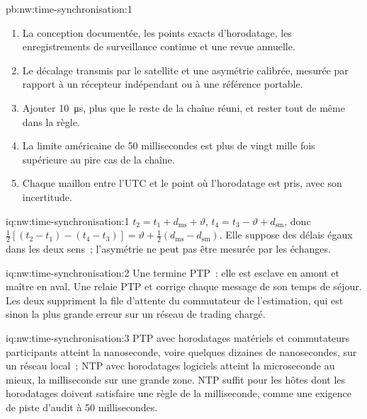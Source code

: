 \begin{solution}{pb:nw:time-synchronisation:1}
\begin{enumerate}
\item La conception documentée, les points exacts d'horodatage, les enregistrements de surveillance continue et une revue annuelle.
\item Le décalage transmis par le satellite et une asymétrie calibrée, mesurée par rapport à un récepteur indépendant ou à une référence portable.
\item Ajouter \qty{10}{\micro\second}, plus que le reste de la chaîne réuni, et rester tout de même dans la règle.
\item La limite américaine de 50 millisecondes est plus de vingt mille fois supérieure au pire cas de la chaîne.
\item Chaque maillon entre l'UTC et le point où l'horodatage est pris, avec son incertitude.
\end{enumerate}
\end{solution}

\begin{solution}{iq:nw:time-synchronisation:1}
$t_2 = t_1 + d_{\mathrm{ms}} + \vartheta$, $t_4 = t_3 - \vartheta + d_{\mathrm{sm}}$, donc
$\tfrac12[(t_2 - t_1) - (t_4 - t_3)] = \vartheta + \tfrac12(d_{\mathrm{ms}} - d_{\mathrm{sm}})$. Elle suppose des délais égaux dans les deux sens~;
l'asymétrie ne peut pas être mesurée par les échanges.
\end{solution}

\begin{solution}{iq:nw:time-synchronisation:2}
Une  termine PTP~: elle est esclave en amont et maître en aval. Une  relaie PTP et corrige chaque
message de son temps de séjour. Les deux suppriment la file d'attente du commutateur de l'estimation, qui est sinon la plus grande erreur sur
un réseau de trading chargé.
\end{solution}

\begin{solution}{iq:nw:time-synchronisation:3}
PTP avec horodatages matériels et commutateurs participants atteint la nanoseconde, voire quelques dizaines de nanosecondes, sur un réseau local~; NTP avec
horodatages logiciels atteint la microseconde au mieux, la milliseconde sur une grande zone. NTP suffit pour les hôtes dont les horodatages doivent satisfaire
une règle de la milliseconde, comme une exigence de piste d'audit à 50 millisecondes.
\end{solution}

